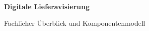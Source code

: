 \documentclass[11pt,a4paper]{article}
\begin{document}
\begin{center}
  {\LARGE\bfseries\color{MinovaDark} Digitale Lieferavisierung\par}
  \vspace{0.25cm}
  {\large\color{MinovaBlue} Fachlicher Überblick und Komponentenmodell\par}
\end{center}
\vspace{0.7cm}




\end{document}
